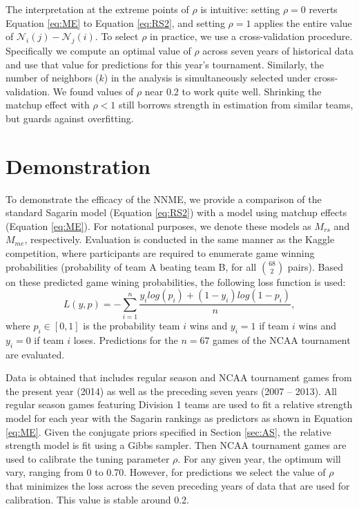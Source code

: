 \documentclass[letterpaper,12pt]{article}
\begin{document}
The interpretation at the extreme points of $\rho$ is intuitive: setting $\rho = 0$ reverts Equation \ref{eq:ME} to Equation \ref{eq:RS2}, and setting $\rho = 1$ applies the entire value of $\mathcal{N}_i(j) -\mathcal{N}_j(i)$. To select $\rho$ in practice, we use a cross-validation procedure. Specifically we compute an optimal value of $\rho$ across seven years of historical data and use that value for predictions for this year's tournament. Similarly, the number of neighbors ($k$) in the analysis is simultaneously selected under cross-validation. We found values of $\rho$ near 0.2 to work quite well. Shrinking the matchup effect with $\rho <1$ still borrows strength in estimation from similar teams, but guards against overfitting.


\section{Demonstration \label{sec:demon}}
To demonstrate the efficacy of the NNME, we provide a comparison of the standard Sagarin model (Equation \ref{eq:RS2}) with a model using matchup effects (Equation \ref{eq:ME}). For notational purposes, we denote these models as $M_{rs}$ and $M_{me}$, respectively. Evaluation is conducted in the same manner as the Kaggle competition, where participants are required to enumerate game winning probabilities (probability of team A beating team B, for all $68 \choose 2$ pairs). Based on these predicted game wining probabilities, the following loss function is used:
\begin{equation}\label{eq:kaggle_score}
L(y,p)=-\sum_{i=1}^n\frac{y_ilog(p_i)+ (1-y_i)log(1-p_i)}{n},
\end{equation}
where $p_i\in[0,1]$ is the probability team $i$ wins and $y_i=1$ if team $i$ wins and $y_i = 0$ if team $i$ loses. Predictions for the $n=67$ games of the NCAA tournament are evaluated.

Data is obtained that includes regular season and NCAA tournament games from the present year (2014) as well as the preceding seven years (2007 -- 2013). All regular season games featuring Division 1 teams are used to fit a relative strength model for each year with the Sagarin rankings as predictors as shown in Equation \ref{eq:ME}. Given the conjugate priors specified in Section \ref{sec:AS}, the relative strength model is fit using a Gibbs sampler. Then NCAA tournament games are used to calibrate the tuning parameter $\rho$. For any given year, the optimum will vary, ranging from 0 to 0.70. However, for predictions we select the value of $\rho$ that minimizes the loss across the seven preceding years of data that are used for calibration. This value is stable around 0.2.
\end{document}
